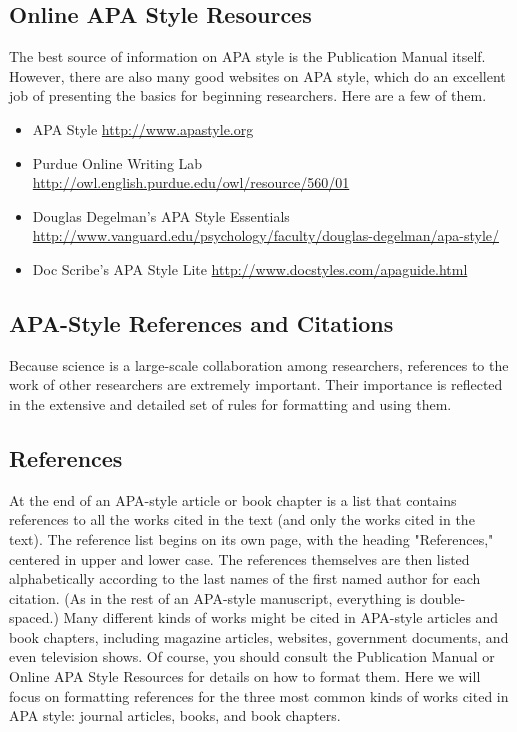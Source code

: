 \subsection{Online APA Style Resources}

 The best source of information on APA style is the Publication Manual itself. However, there are also many good websites on APA style, which do an excellent job of presenting the basics for beginning researchers. Here are a few of them.


 \begin{itemize}
 \item APA Style
\url{http://www.apastyle.org}
 \item Purdue Online Writing Lab \url{http://owl.english.purdue.edu/owl/resource/560/01}

 \item Douglas Degelman's APA Style Essentials
\url{http://www.vanguard.edu/psychology/faculty/douglas-degelman/apa-style/}

  \item Doc Scribe's APA Style Lite
\url{http://www.docstyles.com/apaguide.html}

 \end{itemize}

 \subsection{APA-Style References and Citations}

 Because science is a large-scale collaboration among researchers, references to the work of other researchers are extremely important. Their importance is reflected in the extensive and detailed set of rules for formatting and using them.


 \subsection{References}

At the end of an APA-style article or book chapter is a list that contains references to all the works cited in the text (and only the works cited in the text). The reference list begins on its own page, with the heading "References," centered in upper and lower case. The references themselves are then listed alphabetically according to the last names of the first named author for each citation. (As in the rest of an APA-style manuscript, everything is double- spaced.) Many different kinds of works might be cited in APA-style articles and book chapters, including magazine articles, websites, government documents, and even television shows. Of course, you should consult the Publication Manual or Online APA Style Resources for details on how to format them. Here we will focus on formatting references for the three most common kinds of works cited in APA style: journal articles, books, and book chapters.


